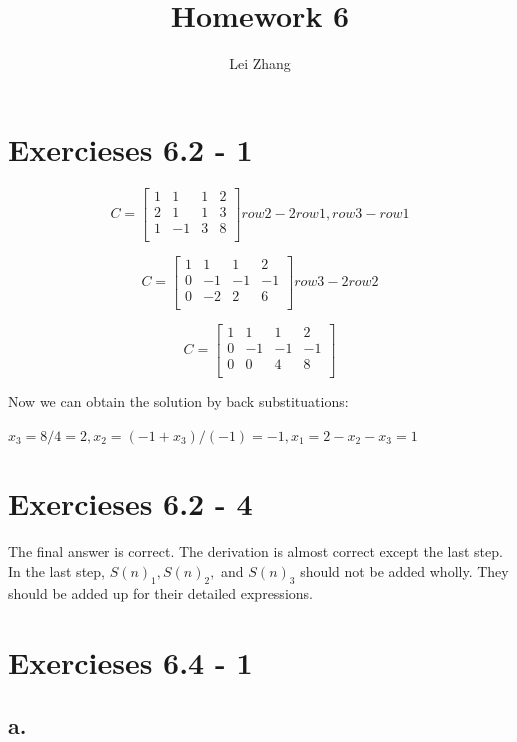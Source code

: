 \documentclass{article}
\title{Homework 6}
\author{Lei Zhang}
\begin{document}
\maketitle

\section{Exercieses 6.2 - 1}

\[
C =
\left[
\begin{array}{cccc}
1& 1 & 1 &2 \\
2& 1 &1 &3\\
1& -1 &3&8\\
\end{array}
\right] row 2 - 2 row 1, row 3- row 1
\]

\[
C =
\left[
\begin{array}{cccc}
1& 1 & 1 &2 \\
0& -1 &-1 &-1\\
0& -2 &2& 6\\
\end{array}
\right] row 3 - 2 row 2
\]

\[
C =
\left[
\begin{array}{cccc}
1& 1 & 1 &2 \\
0& -1 &-1 &-1\\
0& 0 & 4& 8\\
\end{array}
\right]
\]

Now we can obtain the solution by back substituations:

$x_3 = 8/4 = 2, x_2 = (-1 + x_3)/(-1) = -1, x_1 = 2 - x_2 - x_3 = 1$

\section{Exercieses 6.2 - 4}

The final answer is correct. The derivation is almost correct except the last step. In the last step, $S(n)_1, S(n)_2,$ and $ S(n)_3$ should not be added wholly. They should be added up for their detailed expressions.

\section{Exercieses 6.4 - 1}


\subsection*{a. }
\graphicspath{{./Figures/}}
\end{document}
